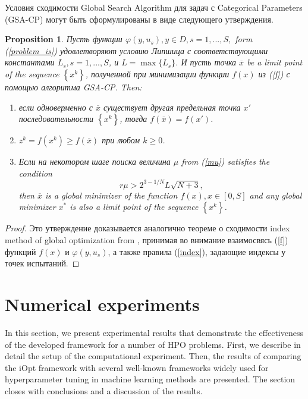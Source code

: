 \documentclass[iicol]{sn-jnl}
\theoremstyle{thmstyleone}%
\newtheorem{proposition}[theorem]{Proposition}%
\theoremstyle{thmstyletwo}%
\theoremstyle{thmstylethree}%
\begin{document}
\textcolor[rgb]{1,0,0}{
Условия сходимости Global Search Algorithm для задач с Categorical Parameters (GSA-CP) могут быть сформулированы в виде следующего утверждения.
\begin{proposition}
Пусть функции $ \varphi(y,u_s), y \in D, s = 1,...,S,$ form (\ref{problem_is}) удовлетворяют условию Липшица с соответствующими константами $L_s, s = 1,...,S$, и $L = \max\{L_s\}$.
И пусть точка $\overline{x}$ be a limit point of the sequence $\left\{x^k\right\} $, полученной при минимизации функции $f(x)$ из (\ref{f}) с помощью алгоритма GSA-CP. Then:
\begin{enumerate}
	\item 
	если одноверменно с $\overline{x}$ существует другая предельная точка $x'$ последовательности $\left\{x^k\right\}$, тогда $f(\overline{x}) = f(x')$.
	\item
	$z^k=f(x^k) \geq f(\overline{x})$ при любом $k \geq 0$.
	\item
	Если на некотором шаге поиска величина $\mu$ from (\ref{mu}) satisfies the condition
\begin{equation}\label{217}
  r \mu > 2^{3-1/N} L \sqrt{N+3},
\end{equation}
then $\overline{x}$ is a global minimizer of the function $f(x), x\in[0,S]$ and any global minimizer $x^\ast$ is also a limit point of the sequence $\left\{x^k\right\}$.
\end{enumerate}
\end{proposition}
\begin{proof}
Это утверждение доказывается аналогично теореме о сходимости index method of global optimization from \citet{Strongin2000}, принимая во внимание взаимосвясь (\ref{f}) функций  $f(x)$ и $\varphi(y,u_s)$, а также правила (\ref{index}), задающие индексы у точек испытаний.
\end{proof}
}

\section{Numerical experiments}\label{sec_exp}
In this section, we present experimental results that demonstrate the effectiveness of the developed framework for a number of HPO problems. First, we describe in detail the setup of the computational experiment. Then, the results of comparing the iOpt framework with several well-known frameworks widely used for hyperparameter tuning in machine learning methods are presented. The section closes with conclusions and a discussion of the results.
\end{document}
